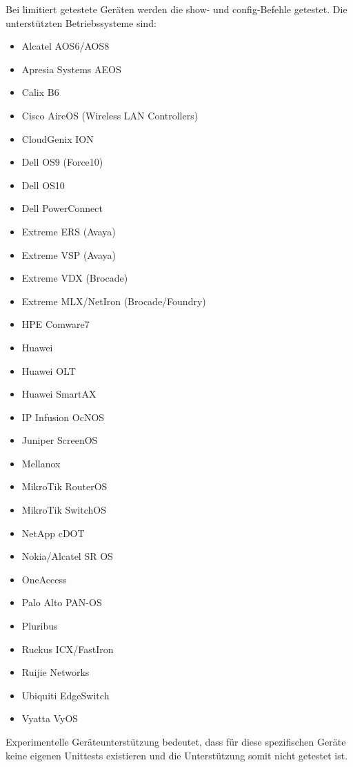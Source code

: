 \documentclass[]{subfiles}
\begin{document}
    \newpage
    
    Bei limitiert getestete Geräten werden die show- und config-Befehle getestet.
    Die unterstützten Betriebssysteme sind:
    
    \begin{itemize}
        \item Alcatel AOS6/AOS8
        \item Apresia Systems AEOS
        \item Calix B6
        \item Cisco AireOS (Wireless LAN Controllers)
        \item CloudGenix ION
        \item Dell OS9 (Force10)
        \item Dell OS10
        \item Dell PowerConnect
        \item Extreme ERS (Avaya)
        \item Extreme VSP (Avaya)
        \item Extreme VDX (Brocade)
        \item Extreme MLX/NetIron (Brocade/Foundry)
        \item HPE Comware7
        \item Huawei
        \item Huawei OLT
        \item Huawei SmartAX
        \item IP Infusion OcNOS
        \item Juniper ScreenOS
        \item Mellanox
        \item MikroTik RouterOS
        \item MikroTik SwitchOS
        \item NetApp cDOT
        \item Nokia/Alcatel SR OS
        \item OneAccess
        \item Palo Alto PAN-OS
        \item Pluribus
        \item Ruckus ICX/FastIron
        \item Ruijie Networks
        \item Ubiquiti EdgeSwitch
        \item Vyatta VyOS
    \end{itemize}
    
    Experimentelle Geräteunterstützung bedeutet, dass für diese spezifischen Geräte keine
    eigenen Unittests existieren und die Unterstützung somit nicht getestet ist.
    
\end{document}
